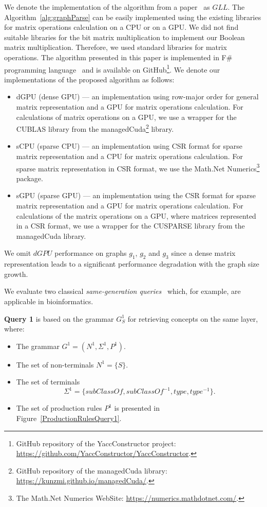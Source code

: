 We denote the implementation of the algorithm from a paper~\cite{GLL} as $GLL$. The Algorithm~\ref{alg:graphParse} can be easily implemented using the existing libraries for matrix operations calculation on a CPU or on a GPU. We did not find suitable libraries for the bit matrix multiplication to implement our Boolean matrix multiplication. Therefore, we used standard libraries for matrix operations. The algorithm presented in this paper is implemented in F\# programming language~\cite{fsharp} and is available on GitHub\footnote{GitHub repository of the YaccConstructor project: \url{https://github.com/YaccConstructor/YaccConstructor}.}. We denote our implementations of the proposed algorithm as follows:
\begin{itemize}
    \item dGPU (dense GPU) --- an implementation using row-major order for general matrix representation and a GPU for matrix operations calculation. For calculations of matrix operations on a GPU, we use a wrapper for the CUBLAS library from the managedCuda\footnote{GitHub repository of the managedCuda library: \url{https://kunzmi.github.io/managedCuda/}.} library.
    \item sCPU (sparse CPU) --- an implementation using CSR format for sparse matrix representation and a CPU for matrix operations calculation. For sparse matrix representation in CSR format, we use the Math.Net Numerics\footnote{The Math.Net Numerics WebSite: \url{https://numerics.mathdotnet.com/}.} package.
    \item sGPU (sparse GPU) --- an implementation using the CSR format for sparse matrix representation and a GPU for matrix operations calculation. For calculations of the matrix operations on a GPU, where matrices represented in a CSR format, we use a wrapper for the CUSPARSE library from the managedCuda library.
\end{itemize}

We omit $dGPU$ performance on graphs $g_1$, $g_2$ and $g_3$ since a dense matrix representation leads to a significant performance degradation with the graph size growth. 

We evaluate two classical \textit{same-generation queries}~\cite{FndDB} which, for example, are applicable in bioinformatics.

\textbf{Query 1} is based on the grammar $G^1_S$ for retrieving concepts on the same layer, where:
\begin{itemize}
    \item The grammar $G^1 = (N^1, \Sigma^1, P^1)$.
    \item The set of non-terminals $N^1 = \{S\}$.
    \item The set of terminals $$\Sigma^1 = \{subClassOf, subClassOf^{-1}, type, type^{-1}\}.$$
    \item The set of production rules $P^1$ is presented in Figure~\ref{ProductionRulesQuery1}.
\end{itemize}

